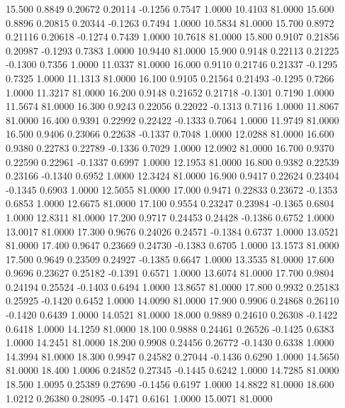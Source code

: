   15.500   0.8849   0.20672   0.20114  -0.1256   0.7547   1.0000  10.4103  81.0000
  15.600   0.8896   0.20815   0.20344  -0.1263   0.7494   1.0000  10.5834  81.0000
  15.700   0.8972   0.21116   0.20618  -0.1274   0.7439   1.0000  10.7618  81.0000
  15.800   0.9107   0.21856   0.20987  -0.1293   0.7383   1.0000  10.9440  81.0000
  15.900   0.9148   0.22113   0.21225  -0.1300   0.7356   1.0000  11.0337  81.0000
  16.000   0.9110   0.21746   0.21337  -0.1295   0.7325   1.0000  11.1313  81.0000
  16.100   0.9105   0.21564   0.21493  -0.1295   0.7266   1.0000  11.3217  81.0000
  16.200   0.9148   0.21652   0.21718  -0.1301   0.7190   1.0000  11.5674  81.0000
  16.300   0.9243   0.22056   0.22022  -0.1313   0.7116   1.0000  11.8067  81.0000
  16.400   0.9391   0.22992   0.22422  -0.1333   0.7064   1.0000  11.9749  81.0000
  16.500   0.9406   0.23066   0.22638  -0.1337   0.7048   1.0000  12.0288  81.0000
  16.600   0.9380   0.22783   0.22789  -0.1336   0.7029   1.0000  12.0902  81.0000
  16.700   0.9370   0.22590   0.22961  -0.1337   0.6997   1.0000  12.1953  81.0000
  16.800   0.9382   0.22539   0.23166  -0.1340   0.6952   1.0000  12.3424  81.0000
  16.900   0.9417   0.22624   0.23404  -0.1345   0.6903   1.0000  12.5055  81.0000
  17.000   0.9471   0.22833   0.23672  -0.1353   0.6853   1.0000  12.6675  81.0000
  17.100   0.9554   0.23247   0.23984  -0.1365   0.6804   1.0000  12.8311  81.0000
  17.200   0.9717   0.24453   0.24428  -0.1386   0.6752   1.0000  13.0017  81.0000
  17.300   0.9676   0.24026   0.24571  -0.1384   0.6737   1.0000  13.0521  81.0000
  17.400   0.9647   0.23669   0.24730  -0.1383   0.6705   1.0000  13.1573  81.0000
  17.500   0.9649   0.23509   0.24927  -0.1385   0.6647   1.0000  13.3535  81.0000
  17.600   0.9696   0.23627   0.25182  -0.1391   0.6571   1.0000  13.6074  81.0000
  17.700   0.9804   0.24194   0.25524  -0.1403   0.6494   1.0000  13.8657  81.0000
  17.800   0.9932   0.25183   0.25925  -0.1420   0.6452   1.0000  14.0090  81.0000
  17.900   0.9906   0.24868   0.26110  -0.1420   0.6439   1.0000  14.0521  81.0000
  18.000   0.9889   0.24610   0.26308  -0.1422   0.6418   1.0000  14.1259  81.0000
  18.100   0.9888   0.24461   0.26526  -0.1425   0.6383   1.0000  14.2451  81.0000
  18.200   0.9908   0.24456   0.26772  -0.1430   0.6338   1.0000  14.3994  81.0000
  18.300   0.9947   0.24582   0.27044  -0.1436   0.6290   1.0000  14.5650  81.0000
  18.400   1.0006   0.24852   0.27345  -0.1445   0.6242   1.0000  14.7285  81.0000
  18.500   1.0095   0.25389   0.27690  -0.1456   0.6197   1.0000  14.8822  81.0000
  18.600   1.0212   0.26380   0.28095  -0.1471   0.6161   1.0000  15.0071  81.0000
